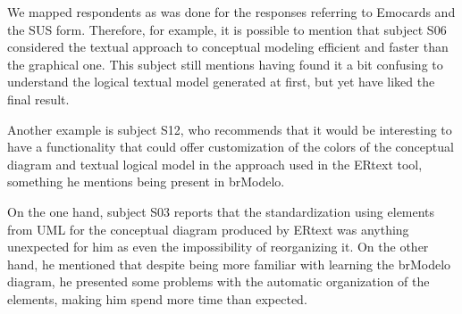 We mapped respondents as was done for the responses referring to Emocards and the SUS form.
Therefore, for example, it is possible to mention that subject S06 considered the textual approach to conceptual modeling efficient and faster than the graphical one.
This subject still mentions having found it a bit confusing to understand the logical textual model generated at first, but yet have liked the final result.

Another example is subject S12, who recommends that it would be interesting to have a functionality that could offer customization of the colors of the conceptual diagram and textual logical model in the approach used in the ERtext tool, something he mentions being present in brModelo.

On the one hand, subject S03 reports that the standardization using elements from UML for the conceptual diagram produced by ERtext was anything unexpected for him as even the impossibility of reorganizing it.
On the other hand, he mentioned that despite being more familiar with learning the brModelo diagram, he presented some problems with the automatic organization of the elements, making him spend more time than expected.

